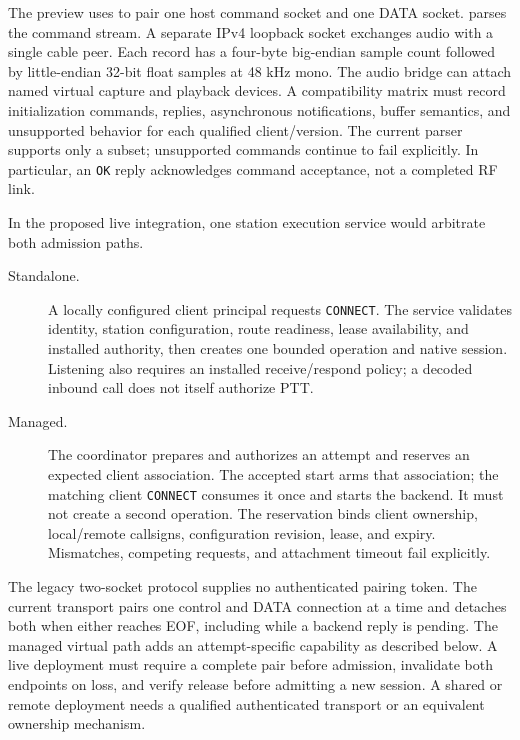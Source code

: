 The preview uses  to pair one host command socket and one
DATA socket.  parses the command stream.
A separate IPv4 loopback socket exchanges audio with a single cable peer.
Each record has a four-byte big-endian sample count followed by little-endian
32-bit float samples at 48 kHz mono. The audio bridge can attach named
virtual capture and playback devices.
A compatibility matrix must record initialization commands, replies,
asynchronous notifications, buffer semantics, and unsupported behavior for
each qualified client/version. The current parser supports only a subset;
unsupported commands continue to fail explicitly. In particular, an
\texttt{OK} reply acknowledges command acceptance, not a completed RF link.

In the proposed live integration, one station execution service would
arbitrate both admission paths.
\begin{description}
\item[Standalone.] A locally configured client principal requests
\texttt{CONNECT}. The service validates identity, station configuration,
route readiness, lease availability, and installed authority, then creates
one bounded operation and native session. Listening also requires an installed
receive/respond policy; a decoded inbound call does not itself authorize PTT.
\item[Managed.] The coordinator prepares and authorizes an attempt and
reserves an expected client association. The accepted start arms that
association; the matching client \texttt{CONNECT} consumes it once and starts
the backend. It must not create a second operation. The reservation binds
client ownership, local/remote callsigns, configuration revision, lease, and
expiry. Mismatches, competing requests, and attachment timeout fail explicitly.
\end{description}

The legacy two-socket protocol supplies no authenticated pairing token.
The current transport pairs one control and DATA connection at a time and
detaches both when either reaches EOF, including while a backend reply is
pending. The managed virtual path adds an attempt-specific capability as
described below. A live deployment must require a complete pair before
admission, invalidate both endpoints on loss, and verify release before
admitting a new session. A shared or remote deployment needs a qualified
authenticated transport or an equivalent ownership mechanism.

